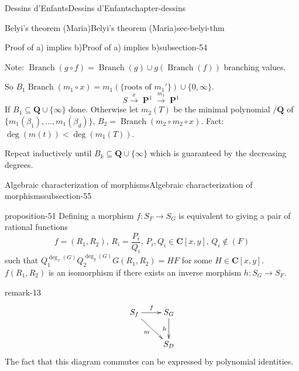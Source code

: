 \documentclass[oneside,10pt,]{book}
\numberwithin{equation}{section}
\newcommand{\lb}{[}
\newcommand{\rb}{]}
\newcommand{\QQ}{\mathbf{Q}}
\newcommand{\CC}{\mathbf{C}}
\DeclareMathOperator{\PP}{\mathbf{P}}
\newcommand{\lt}{<}
\begin{document}
\begin{chapterptx}{Dessins d'Enfants}{}{Dessins d'Enfants}{}{}{chapter-dessins}
\begin{sectionptx}{Belyi's theorem (Maria)}{}{Belyi's theorem (Maria)}{}{}{sec-belyi-thm}
\begin{subsectionptx}{Proof of a) implies b)}{}{Proof of a) implies b)}{}{}{subsection-54}
\par
\hypertarget{p-606}{}%
Note: \(\operatorname{Branch}(g\circ f) = \operatorname{Branch}(g) \cup g(\operatorname{Branch}(f))\) branching values.%
\par
\hypertarget{p-607}{}%
So \(B_1 \operatorname{Branch}(m_1 \circ x) = m_1(\{\text{roots of }m_1'\}) \cup\{0,\infty\}\).%
\begin{equation*}
S\xrightarrow x \PP^1 \xrightarrow{m_1} \PP^1
\end{equation*}
If \(B_1 \subseteq \QQ \cup \{\infty\}\) done. Otherwise let \(m_2(T) \) be the minimal polynomial \(/\QQ\) of \(\{m_1(\beta_1) ,\ldots, m_1(\beta_d) \}\), \(B_2 = \operatorname{Branch}(m_2\circ m_2 \circ x)\). Fact: \(\deg(m(t)) \lt \deg(m_1(T))\).%
\par
\hypertarget{p-608}{}%
Repeat inductively until \(B_k \subseteq \QQ \cup \{\infty\}\) which is guaranteed by the decreasing degrees.%
\end{subsectionptx}
%
%
\typeout{************************************************}
\typeout{************************************************}
%
\begin{subsectionptx}{Algebraic characterization of morphisms}{}{Algebraic characterization of morphisms}{}{}{subsection-55}
\begin{proposition}{}{}{proposition-51}%
\hypertarget{p-609}{}%
Defining a morphism \(f \colon S_F\to S_G\) is equivalent to giving a pair of rational functions%
\begin{equation*}
f=  (R_1, R_2),\,R_i= \frac{P_i}{Q_i},\,    P_i,Q_i\in \CC[x,y],\,Q_i\not\in (F)
\end{equation*}
such that \(Q_1^{\deg_x(G)}Q_2^{\deg_y(G)} G(R_1, R_2) = HF\) for some \(H \in \CC\lb x, y\rb\). \(f(R_1, R_2)\) is an isomorphism if there exists an inverse morphism \(h\colon S_G\to S_F\).%
\end{proposition}
\begin{remark}{}{remark-13}%
\hypertarget{p-610}{}%
%
\begin{equation*}
\xymatrix{
S_f \ar[r]^f \ar[dr]_m & S_G \ar[d]_h \\
& S_D
}
\end{equation*}
The fact that this diagram commutes can be expressed by polynomial identities.%
\end{remark}
\end{subsectionptx}
%
%
\typeout{************************************************}

\end{sectionptx}
\end{chapterptx}
\end{document}
